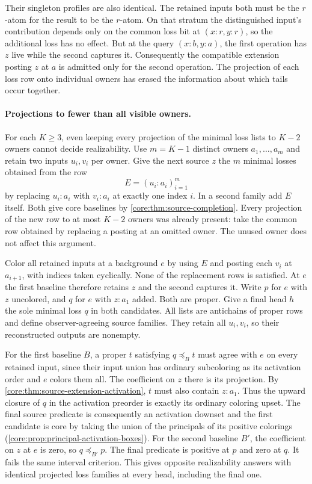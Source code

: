 Their singleton profiles are also identical.
The retained inputs both must be the $r$-atom
for the result to be the $r$-atom. On that
stratum the distinguished input's contribution
depends only on the common loss bit at
$(x{:}r,y{:}r)$, so the additional loss has
no effect. But at the query $(x{:}b,y{:}a)$,
the first operation has $z$ live while the
second captures it. Consequently the compatible
extension posting $z$ at $a$ is admitted only
for the second operation. The projection of each
loss row onto individual owners has erased the
information about which tails occur together.

\paragraph{Projections to fewer than all visible owners.}
For each $K\ge3$, even keeping every projection
of the minimal loss lists to $K-2$ owners cannot
decide realizability. Use $m=K-1$ distinct owners
$a_1,\ldots,a_m$ and retain two inputs $u_i,v_i$ per
owner. Give the next source $z$ the $m$ minimal
losses obtained from the row
\[
 E=(u_i{:}a_i)_{i=1}^m
\]
by replacing $u_i{:}a_i$ with $v_i{:}a_i$ at exactly
one index $i$. In a second family add $E$ itself.
Both give core baselines by
\cref{core:thm:source-completion}. Every projection
of the new row to at most $K-2$ owners was already
present: take the common row obtained by replacing
a posting at an omitted owner. The unused owner
does not affect this argument.

Color all retained inputs at a background $e$ by
using $E$ and posting each $v_i$ at $a_{i+1}$,
with indices taken cyclically. None of the replacement
rows is satisfied. At $e$ the first baseline therefore
retains $z$ and the second captures it. Write $p$ for
$e$ with $z$ uncolored, and $q$ for $e$ with
$z{:}a_1$ added. Both are proper. Give a final head
$h$ the sole minimal loss $q$ in both candidates.
All lists are antichains of proper rows and define
observer-agreeing source families. They retain all
$u_i,v_i$, so their reconstructed outputs are nonempty.

For the first baseline $B$, a proper $t$ satisfying
$q\preceq_B t$ must agree with $e$ on every retained
input, since their input union has ordinary subcoloring
as its activation order and $e$ colors them all.
The coefficient on $z$ there is its projection.
By \cref{core:thm:source-extension-activation}, $t$
must also contain $z{:}a_1$. Thus the upward closure
of $q$ in the activation preorder is exactly its
ordinary coloring upset. The final source predicate
is consequently an activation downset and the first
candidate is core by taking the union of the principals
of its positive colorings (\cref{core:prop:principal-activation-boxes}).
For the second baseline $B'$, the coefficient on $z$ at
$e$ is zero, so $q\preceq_{B'} p$.
The final predicate is positive at $p$ and zero at
$q$. It fails the same interval criterion. This gives
opposite realizability answers with identical projected
loss families at every head, including the final one.

